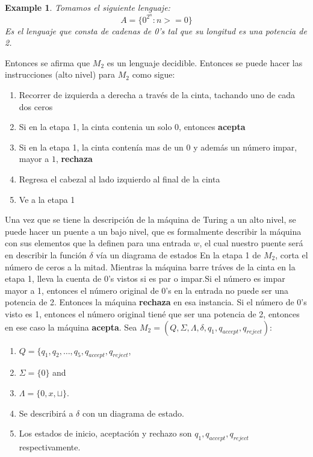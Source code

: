 \documentclass[10pt]{report}
\newtheorem{example}{Example}
\begin{document}
    \begin{example}
        Tomamos el siguiente lenguaje:
        \begin{equation}
            A = \{ 0^2^n : n>=0\}\label{eq:equation2}
        \end{equation}
        Es el lenguaje que consta de cadenas de 0's tal que su longitud es una
        potencia de 2.
    \end{example}
    Entonces se afirma que $M_{2}$ es un lenguaje decidible.
    Entonces se puede hacer las instrucciones (alto  nivel) para $M_{2}$ como sigue:
    \begin{enumerate}
        \item Recorrer de izquierda a derecha a través de la cinta, tachando uno de cada dos ceros
        \item Si en la etapa 1, la cinta contenia un solo $0$, entonces \textbf{acepta}
        \item Si en la etapa 1, la cinta contenía mas de un $0$ y además un número impar, mayor a $1$, \textbf{rechaza}
        \item Regresa el cabezal al lado izquierdo al final de la cinta
        \item Ve a la etapa 1
    \end{enumerate}
    Una vez que se tiene la descripción de la máquina de Turing a un alto nivel, se puede hacer un puente
    a un bajo nivel, que es formalmente describir la máquina con sus elementos que la definen para una entrada $w$,
    el cual nuestro puente será en describir la función $\delta$ vía un diagrama de estados
    En la etapa 1 de $M_{2}$, corta el número de ceros a la mitad. Mientras la máquina barre tráves de la cinta en la
    etapa 1, lleva la cuenta de $0$'s vistos si es par o impar.\newline Si el número es impar mayor a 1, entonces el número original
    de $0$'s en la entrada no puede ser una potencia de 2. Entonces la máquina \textbf{rechaza} en esa instancia.
    Si el número de 0's visto es 1, entonces el número original tiené que ser una potencia de 2, entonces en ese
    caso la máquina \textbf{acepta}.
    Sea $M_{2} =(Q,\Sigma,\Lambda,\delta,q_{1},q_{accept},q_{reject})$:
    \begin{enumerate}
        \item $Q = \{q_{1},q_{2},\dots,q_{5},q_{accept},q_{reject}$,
        \item $\Sigma = \{ 0 \}$ and
        \item $\Lambda = \{0,x,\sqcup \}$.
        \item Se describirá a $\delta$ con un diagrama de estado.
        \item Los estados de inicio, aceptación y rechazo son $q_{1},q_{accept},q_{reject}$ respectivamente.
    \end{enumerate}
    \newline
\end{document}
